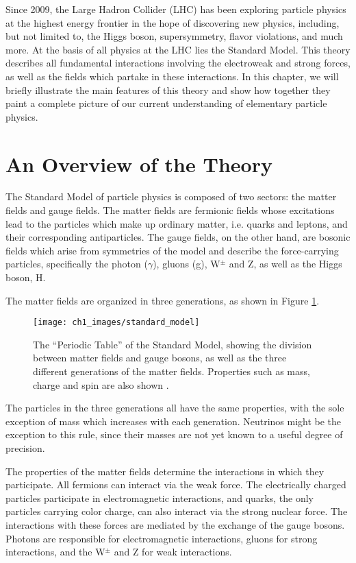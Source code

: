 \documentclass[10pt,a4paper]{book}
\begin{document}
Since 2009, the Large Hadron Collider (LHC) has been exploring particle physics at the highest energy frontier in the hope of discovering new physics, including, but not limited to, the Higgs boson, supersymmetry, flavor violations, and much more. At the basis of all physics at the LHC lies the Standard Model. This theory describes all fundamental interactions involving the electroweak and strong forces, as well as the fields which partake in these interactions. In this chapter, we will briefly illustrate the main features of this theory and show how together they paint a complete picture of our current understanding of elementary particle physics.



\section{An Overview of the Theory}
The Standard Model of particle physics is composed of two sectors: the matter fields and gauge fields. The matter fields are fermionic fields whose excitations lead to the particles which make up ordinary matter, i.e. quarks and leptons, and their corresponding antiparticles. The gauge fields, on the other hand, are bosonic fields which arise from symmetries of the model and describe the force-carrying particles, specifically the photon ($\gamma$), gluons (g), W$^{\pm}$ and Z, as well as the Higgs boson, H.

The matter fields are organized in three generations, as shown in Figure \ref{Standard Model particles}.
\begin{figure}
\centering
\texttt{[image: ch1\_images/standard\_model]}
\caption{The ``Periodic Table'' of the Standard Model, showing the division between matter fields and gauge bosons, as well as the three different generations of the matter fields. Properties such as mass, charge and spin are also shown \cite{sm_particles}.}
\label{Standard Model particles}
\end{figure}
The particles in the three generations all have the same properties, with the sole exception of mass which increases with each generation. Neutrinos might be the exception to this rule, since their masses are not yet known to a useful degree of precision. 

The properties of the matter fields determine the interactions in which they participate. All fermions can interact via the weak force. The electrically charged particles participate in electromagnetic interactions, and quarks, the only particles carrying color charge, can also interact via the strong nuclear force. The interactions with these forces are mediated by the exchange of the gauge bosons. Photons are responsible for electromagnetic interactions, gluons for strong interactions, and the W$^\pm$ and Z for weak interactions. 
\end{document}
